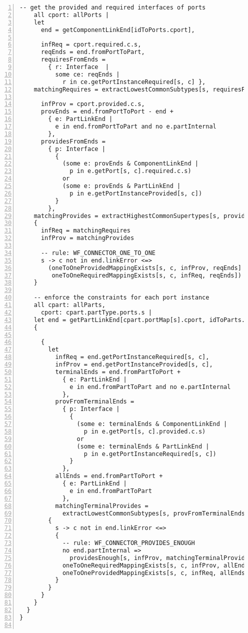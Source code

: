 \begin{lstlisting}[caption={bb\_port\_inference.als}, numbers=left]
    -- get the provided and required interfaces of ports
    all cport: allPorts |
    let
      end = getComponentLinkEnd[idToPorts.cport],
      
      infReq = cport.required.c.s,
      reqEnds = end.fromPortToPart,
      requiresFromEnds =
        { r: Interface  |
          some ce: reqEnds |
            r in ce.getPortInstanceRequired[s, c] },
    matchingRequires = extractLowestCommonSubtypes[s, requiresFromEnds],
      
      infProv = cport.provided.c.s,
      provEnds = end.fromPortToPort - end +
        { e: PartLinkEnd |
          e in end.fromPortToPart and no e.partInternal
        },
      providesFromEnds =
        { p: Interface |
          {
            (some e: provEnds & ComponentLinkEnd |
              p in e.getPort[s, c].required.c.s)
            or
            (some e: provEnds & PartLinkEnd |
              p in e.getPortInstanceProvided[s, c])
          }
        },
    matchingProvides = extractHighestCommonSupertypes[s, providesFromEnds]
    {
      infReq = matchingRequires
      infProv = matchingProvides

      -- rule: WF_CONNECTOR_ONE_TO_ONE
      s -> c not in end.linkError <=>
        (oneToOneProvidedMappingExists[s, c, infProv, reqEnds] and
         oneToOneRequiredMappingExists[s, c, infReq, reqEnds])
    }

    -- enforce the constraints for each port instance
    all cpart: allParts,
      cport: cpart.partType.ports.s |
    let end = getPartLinkEnd[cpart.portMap[s].cport, idToParts.cpart]
    {
      
      {
        let
          infReq = end.getPortInstanceRequired[s, c],        
          infProv = end.getPortInstanceProvided[s, c],
          terminalEnds = end.fromPartToPort +
            { e: PartLinkEnd |
              e in end.fromPartToPart and no e.partInternal
            },
          provFromTerminalEnds =
            { p: Interface |
              {
                (some e: terminalEnds & ComponentLinkEnd |
                  p in e.getPort[s, c].provided.c.s)
                or
                (some e: terminalEnds & PartLinkEnd |
                  p in e.getPortInstanceRequired[s, c])
              }
            },
          allEnds = end.fromPartToPort +
            { e: PartLinkEnd |
              e in end.fromPartToPart
            },
          matchingTerminalProvides =
            extractLowestCommonSubtypes[s, provFromTerminalEnds]
        {
          s -> c not in end.linkError <=>
          {
            -- rule: WF_CONNECTOR_PROVIDES_ENOUGH
            no end.partInternal =>
              providesEnough[s, infProv, matchingTerminalProvides]
            oneToOneRequiredMappingExists[s, c, infProv, allEnds]
            oneToOneProvidedMappingExists[s, c, infReq, allEnds]
          }
        }
      }
    }
  }
}


\end{lstlisting}
